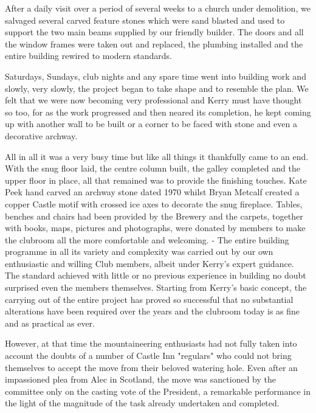 \documentclass[a5paper,openany,font 10pt]{scrbook}
\begin{document}
After a daily visit over a period of several weeks to a
church under demolition, we salvaged several carved feature
stones which were sand blasted and used to support the two main
beams supplied by our friendly builder. The doors and all the
window frames were taken out and replaced, the plumbing installed
and the entire building rewired to modern standards.

Saturdays, Sundays, club nights and any spare time went into
building work and slowly, very slowly, the project began to take
shape and to resemble the plan. We felt that we were now becoming
very professional and Kerry must have thought so too, for as the
work progressed and then neared its completion, he kept coming up
with another wall to be built or a corner to be faced with stone
and even a decorative archway.

All in all it was a very busy time but like all things it
thankfully came to an end. With the snug floor laid, the centre
column built, the galley completed and the upper floor in place,
all that remained was to provide the finishing touches. Kate Peek
hand carved an archway stone dated 1970 whilst Bryan Metcalf
created a copper Castle motif with crossed ice axes to decorate
the snug fireplace. Tables, benches and chairs had been provided
by the Brewery and the carpets, together with books, maps,
pictures and photographs, were donated by members to make the
clubroom all the more comfortable and welcoming. -
The entire building programme in all its variety and
complexity was carried out by our own enthusiastic and willing
Club members, albeit under Kerry's expert guidance. The standard
achieved with little or no previous experience in building no
doubt surprised even the members themselves. Starting from
Kerry's basic concept, the carrying out of the entire project has
proved so successful that no substantial alterations have been
required over the years and the clubroom today is as fine and as
practical as ever.

However, at that time the mountaineering enthusiasts had not
fully taken into account the doubts of a number of Castle Inn
"regulars" who could not bring themselves to accept the move from
their beloved watering hole. Even after an impassioned plea from
Alec in Scotland, the move was sanctioned by the committee only
on the casting vote of the President, a remarkable performance in
the light of the magnitude of the task already undertaken and
completed.
\end{document}
